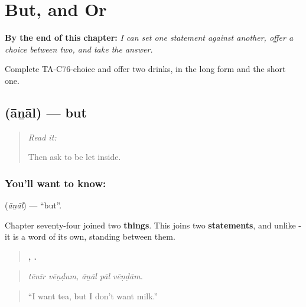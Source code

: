 
\chapter{But, and Or}
\label{ch:ta-but-and-or}

\begin{chapteropening}
\textbf{By the end of this chapter:} \emph{I can set one statement against another, offer a choice between two, and take the answer.}

Complete TA-C76-choice and offer two drinks, in the long form and the short one.
\end{chapteropening}

\section[\texorpdfstring{\ta{ஆனால்} (āṉāl)}{ஆனால் (āṉāl)}]{ (āṉāl) — but}

\label{lesson:TA-C76-but}



\begin{quote}
\emph{Read it:} \textbf{}

Then ask to be let inside.
\end{quote}

\subsection*{You'll want to know: }
\textbf{} (\emph{āṉāl}) — \textquotedblleft{}but\textquotedblright{}.

Chapter seventy-four joined two \textbf{things}. This joins two \textbf{statements}, and unlike - it is a word of its own, standing between them.

\begin{quote}
\textbf{ ,   .}
\end{quote}

\begin{quote}
\emph{tēnīr vēṇḍum, āṉāl pāl vēṇḍām.}
\end{quote}

\begin{quote}
\textquotedblleft{}I want tea, but I don't want milk.\textquotedblright{}
\end{quote}

